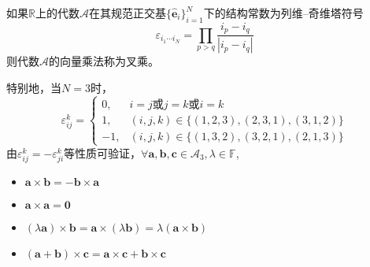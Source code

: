 \documentclass[main.tex]{subfiles}
\begin{document}
\begin{definition}[向量的叉乘]
如果$\mathbb{R}$上的代数$\mathcal{A}$在其规范正交基$\{\hat{\mathbf{e}}_i\}_{i=1}^N$下的结构常数为列维--奇维塔符号
\[\varepsilon_{i_1\cdots i_N}=\prod_{p>q}\frac{i_p-i_q}{\left|i_p-i_q\right|}\]
则代数$\mathcal{A}$的向量乘法称为叉乘。
\end{definition}
特别地，当$N=3$时，
\[\varepsilon_{ij}^k=
\begin{cases}
0,&i=j\text{或}j=k\text{或}i=k\\
1,&\left(i,j,k\right)\in\{\left(1,2,3\right),\left(2,3,1\right),\left(3,1,2\right)\}\\
-1,&\left(i,j,k\right)\in\{\left(1,3,2\right),\left(3,2,1\right),\left(2,1,3\right)\}\end{cases}\]
由$\varepsilon_{ij}^k=-\varepsilon_{ji}^k$等性质可验证，$\forall\mathbf{a},\mathbf{b},\mathbf{c}\in\mathcal{A}_3,\lambda\in\mathbb{F}$,\begin{itemize}
    \item $\mathbf{a}\times\mathbf{b}=-\mathbf{b}\times\mathbf{a}$
    \item $\mathbf{a}\times\mathbf{a}=\bm{0}$
    \item $\left(\lambda\mathbf{a}\right)\times\mathbf{b}=\mathbf{a}\times\left(\lambda\mathbf{b}\right)=\lambda\left(\mathbf{a}\times\mathbf{b}\right)$
    \item $\left(\mathbf{a}+\mathbf{b}\right)\times\mathbf{c}=\mathbf{a}\times\mathbf{c}+\mathbf{b}\times\mathbf{c}$
    
\end{itemize}
\end{document}
